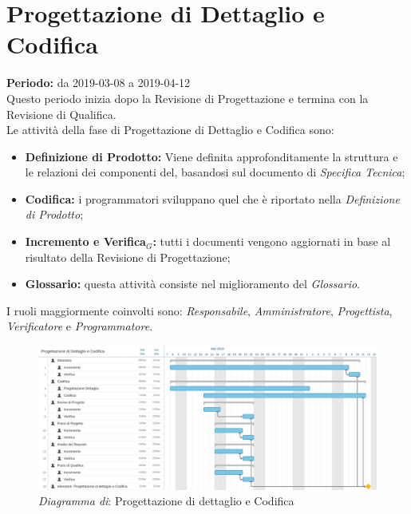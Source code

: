 \section{Progettazione di Dettaglio e Codifica}
\textbf{Periodo:} da 2019-03-08 a 2019-04-12\\
Questo periodo inizia dopo la Revisione di Progettazione e termina con la Revisione di Qualifica.\\Le attività della fase di Progettazione di Dettaglio e Codifica sono:
\begin{itemize}
    \item \textbf{Definizione di Prodotto:} Viene definita approfonditamente la struttura e le relazioni dei componenti del, basandosi sul documento di \textit{Specifica Tecnica};
    \item \textbf{Codifica:} i programmatori sviluppano quel che è riportato nella \textit{Definizione di Prodotto};
    \item \textbf{Incremento e Verifica$_{G}$:} tutti i documenti vengono aggiornati in base al risultato della Revisione di Progettazione;
    \item \textbf{Glossario:} questa attività consiste nel miglioramento del \textit{Glossario}.
\end{itemize}
I ruoli maggiormente coinvolti sono: \textit{Responsabile}, \textit{Amministratore}, \textit{Progettista}, \textit{Verificatore} e \textit{Programmatore}.
\begin{figure} [h]
    \centering
    \includegraphics[scale=0.14]{./images/codifica.jpg}
    \caption{\textit{Diagramma di}: Progettazione di dettaglio e Codifica }\label{}
\end{figure}
\newpage
